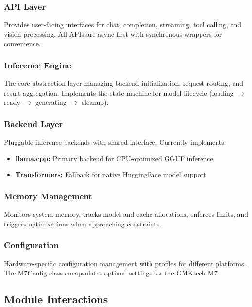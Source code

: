 \subsubsection{API Layer}

Provides user-facing interfaces for chat, completion, streaming, tool calling, and vision processing. All APIs are async-first with synchronous wrappers for convenience.

\subsubsection{Inference Engine}

The core abstraction layer managing backend initialization, request routing, and result aggregation. Implements the state machine for model lifecycle (loading $\rightarrow$ ready $\rightarrow$ generating $\rightarrow$ cleanup).

\subsubsection{Backend Layer}

Pluggable inference backends with shared interface. Currently implements:

\begin{itemize}
    \item \textbf{llama.cpp:} Primary backend for CPU-optimized GGUF inference
    \item \textbf{Transformers:} Fallback for native HuggingFace model support
\end{itemize}

\subsubsection{Memory Management}

Monitors system memory, tracks model and cache allocations, enforces limits, and triggers optimizations when approaching constraints.

\subsubsection{Configuration}

Hardware-specific configuration management with profiles for different platforms. The M7Config class encapsulates optimal settings for the GMKtech M7.

\subsection{Module Interactions}

